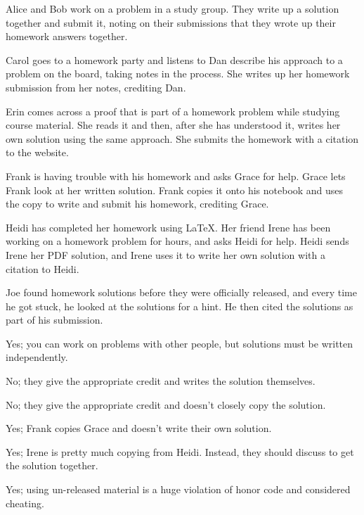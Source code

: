 \documentclass[11pt]{article}
\begin{document}
\begin{Parts}
  \Part Alice and Bob work on a problem in a study group. They write up a solution together and submit it, noting on their submissions that they wrote up their homework answers together. 
  
  
  \Part Carol goes to a homework party and listens to Dan describe his approach to a problem on the board, taking notes in the process. She writes up her homework submission from her notes, crediting Dan.
  
  
  \Part Erin comes across a proof that is part of a homework problem while studying course material. She reads it and then, after she has understood it, writes her own solution using the same approach. She submits the homework with a citation to the website.
  
  
  \Part Frank is having trouble with his homework and asks Grace for help. Grace lets Frank look at her written solution. Frank copies it onto his notebook and uses the copy to write and submit his homework, crediting Grace.
  
  
  \Part Heidi has completed her homework using \LaTeX. Her friend Irene has been working on a homework problem for hours, and asks Heidi for help. Heidi sends Irene her PDF solution, and Irene uses it to write her own solution with a citation to Heidi.
  
  
  \Part
  Joe found homework solutions before they were officially released, and every time he got stuck, he looked at the solutions for a hint. He then cited the solutions as part of his submission.

\end{Parts}

\begin{solution}
\begin{Parts}

\Part Yes; you can work on problems with other people, but solutions must be written independently.

\Part No; they give the appropriate credit and writes the solution themselves.

\Part No; they give the appropriate credit and doesn't closely copy the solution.

\Part Yes; Frank copies Grace and doesn't write their own solution.

\Part Yes; Irene is pretty much copying from Heidi. Instead, they should discuss to get the solution together.

\Part Yes; using un-released material is a huge violation of honor code and considered cheating.

\end{Parts}
\end{solution}
\end{document}
